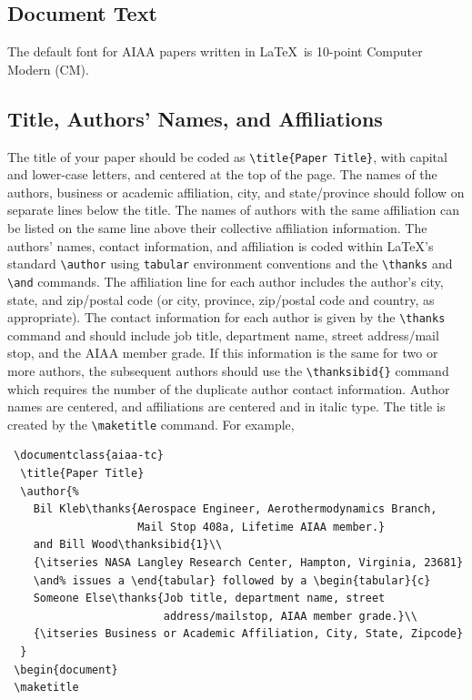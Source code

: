 \documentclass{aiaa-tc}%
\begin{document}
\subsection{Document Text}

The default font for AIAA papers written in \LaTeX\ is 10-point Computer
Modern (CM).

\subsection{Title, Authors' Names, and Affiliations}

The title of your paper should be coded as \verb|\title{Paper Title}|,
with capital and lower-case letters, and centered at the top of the
page.
The names of the authors, business or academic affiliation, city, and
state/province should follow on separate lines below the title.
The names of authors with the same affiliation can be listed on the same
line above their collective affiliation information.
The authors' names, contact information, and affiliation is coded within
\LaTeX's standard \verb|\author| using \verb|tabular| environment
conventions and the \verb|\thanks| and \verb|\and| commands.
The affiliation line for each author includes the author's city, state,
and zip/postal code (or city, province, zip/postal code and country, as
appropriate).
The contact information for each author is given by the \verb|\thanks|
command and should include job title, department name, street
address/mail stop, and the AIAA member grade.
If this information is the same for two or more authors, the subsequent
authors should use the \verb|\thanksibid{}| command which requires the
number of the duplicate author contact information.
Author names are centered, and affiliations are centered and in italic type.
The title is created by the \verb|\maketitle| command.
For example,
\begin{Verbatim}
 \documentclass{aiaa-tc}
  \title{Paper Title}
  \author{%
    Bil Kleb\thanks{Aerospace Engineer, Aerothermodynamics Branch,
                    Mail Stop 408a, Lifetime AIAA member.}
    and Bill Wood\thanksibid{1}\\
    {\itseries NASA Langley Research Center, Hampton, Virginia, 23681}
    \and% issues a \end{tabular} followed by a \begin{tabular}{c}
    Someone Else\thanks{Job title, department name, street
                        address/mailstop, AIAA member grade.}\\
    {\itseries Business or Academic Affiliation, City, State, Zipcode}
  }
 \begin{document}
 \maketitle
\end{Verbatim}
\end{document}
